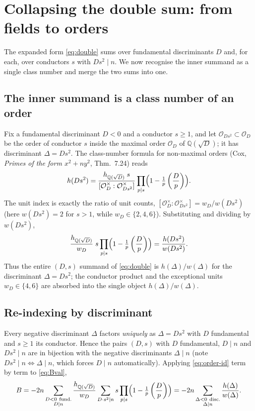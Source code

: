 \documentclass[11pt]{article}
\newcommand{\leg}[2]{\left(\frac{#1}{#2}\right)}
\begin{document}
\section{Collapsing the double sum: from fields to orders}\label{sec:collapse}

The expanded form \eqref{eq:double} sums over fundamental discriminants $D$ and, for each, over conductors $s$
with $Ds^2\mid n$. We now recognise the inner summand as a single class number and merge the two sums into one.

\subsection{The inner summand is a class number of an order}
Fix a fundamental discriminant $D<0$ and a conductor $s\ge1$, and let $\mathcal{O}_{Ds^2}\subset\mathcal{O}_D$ be the
order of conductor $s$ inside the maximal order $\mathcal{O}_D$ of $\mathbb{Q}(\sqrt D)$; it has discriminant
$\Delta=Ds^2$. The class-number formula for non-maximal orders (Cox, \emph{Primes of the form $x^2+ny^2$},
Thm.~7.24) reads
\[
h(Ds^2)=\frac{h_{\mathbb{Q}(\sqrt D)}\;s}{[\mathcal{O}_D^\times:\mathcal{O}_{Ds^2}^\times]}
\prod_{p\mid s}\Bigl(1-\tfrac1p\leg Dp\Bigr).
\]
The unit index is exactly the ratio of unit counts, $[\mathcal{O}_D^\times:\mathcal{O}_{Ds^2}^\times]=w_D/w(Ds^2)$
(here $w(Ds^2)=2$ for $s>1$, while $w_D\in\{2,4,6\}$). Substituting and dividing by $w(Ds^2)$,
\begin{equation}\label{eq:order-id}
\frac{h_{\mathbb{Q}(\sqrt D)}}{w_D}\;s\prod_{p\mid s}\Bigl(1-\tfrac1p\leg Dp\Bigr)
=\frac{h(Ds^2)}{w(Ds^2)}.
\end{equation}
Thus the entire $(D,s)$ summand of \eqref{eq:double} is $h(\Delta)/w(\Delta)$ for the discriminant
$\Delta=Ds^2$; the conductor product and the exceptional units $w_D\in\{4,6\}$ are absorbed into the single
object $h(\Delta)/w(\Delta)$.

\subsection{Re-indexing by discriminant}
Every negative discriminant $\Delta$ factors \emph{uniquely} as $\Delta=Ds^2$ with $D$ fundamental and $s\ge1$
its conductor. Hence the pairs $(D,s)$ with $D$ fundamental, $D\mid n$ and $Ds^2\mid n$ are in bijection with the
negative discriminants $\Delta\mid n$ (note $Ds^2\mid n\iff\Delta\mid n$, which forces $D\mid n$ automatically).
Applying \eqref{eq:order-id} term by term to \eqref{eq:Bval},
\begin{equation}\label{eq:Bsingle}
B=-2n\sum_{\substack{D<0\ \text{fund.}\\ D\mid n}}\frac{h_{\mathbb{Q}(\sqrt D)}}{w_D}\sum_{D\cdot s^2\mid n}s\prod_{p\mid s}\Bigl(1-\tfrac1p\leg Dp\Bigr)
=-2n\sum_{\substack{\Delta<0\ \text{disc.}\\ \Delta\mid n}}\frac{h(\Delta)}{w(\Delta)}.
\end{equation}
\end{document}
